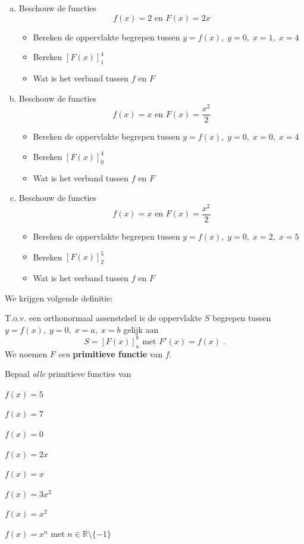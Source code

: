 \documentclass[a4paper,12pt, twoside]{article}
\begin{document}
\begin{oefening}
\begin{enumerate}[(a)]
  \item Beschouw de functies
  $$f(x)=2 \mbox{ en } F(x)=2x$$
  \begin{itemize}
    \item Bereken de oppervlakte begrepen tussen $y=f(x),\;y=0,\;x=1,\;x=4$
    \item Bereken $[F(x)]_1^4$
    \item Wat is het verband tussen $f$ en $F$
  \end{itemize}
  \item Beschouw de functies
  $$f(x)=x \mbox{ en } F(x)=\dfrac{x^2}{2}$$
  \begin{itemize}
    \item Bereken de oppervlakte begrepen tussen $y=f(x),\;y=0,\;x=0,\;x=4$
    \item Bereken $[F(x)]_0^4$
    \item Wat is het verband tussen $f$ en $F$
  \end{itemize}
  \item Beschouw de functies
  $$f(x)=x \mbox{ en } F(x)=\dfrac{x^2}{2}$$
  \begin{itemize}
    \item Bereken de oppervlakte begrepen tussen $y=f(x),\;y=0,\;x=2,\;x=5$
    \item Bereken $[F(x)]_2^5$
    \item Wat is het verband tussen $f$ en $F$
  \end{itemize}
\end{enumerate}
\end{oefening}



We krijgen volgende definitie:

T.o.v. een orthonormaal assenstelsel is de oppervlakte $S$ begrepen tussen $y=f(x),\;y=0,\;x=a,\;x=b$ gelijk aan
$$S=\left[F(x)\right]_a^b \mbox{ met } F'(x)=f(x)\;.$$ We noemen $F$ {\em een} {\bf primitieve functie} van $f$.



\begin{oefening}
Bepaal {\em alle} primitieve functies van
\begin{exlist}{2}
  \item $f(x)=5$
  \item $f(x)=7$
  \item $f(x)=0$
  \item $f(x)=2x$
  \item $f(x)=x$
  \item $f(x)=3x^2$
  \item $f(x)=x^2$
  \item $f(x)=x^n$ met $n\in\mathbb{R}\setminus\{-1\}$
\end{exlist}
\end{oefening}
\end{document}
